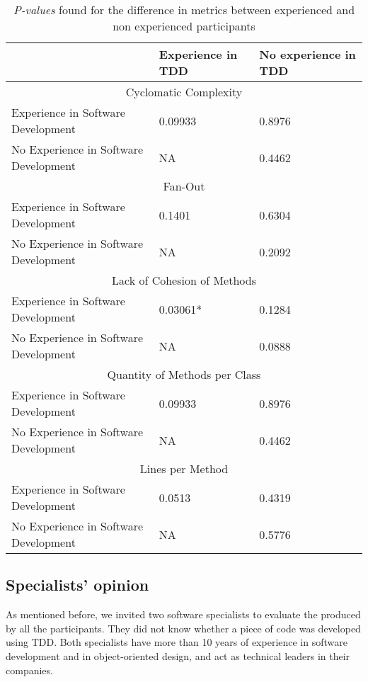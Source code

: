 \documentclass[times]{elsarticle}
\begin{document}
\begin{table}
	\centering
	\begin{tabular}{ | p{4cm} | p{3cm} | p{3cm} | }
		\hline
		  & \textbf{Experience in TDD} & \textbf{No experience in TDD} \\
		\hline
			\multicolumn{3}{|c|}{Cyclomatic Complexity} \\
		\hline
			Experience in Software Development 		& 0.09933	&	0.8976\\
			\hline
			No Experience in Software Development 	& NA		&	0.4462\\
		\hline
			\multicolumn{3}{|c|}{Fan-Out}\\
		\hline
			Experience in Software Development 		& 0.1401	&	0.6304\\
			\hline
			No Experience in Software Development 	& NA		&	0.2092\\
		\hline
			\multicolumn{3}{|c|}{Lack of Cohesion of Methods}\\
		\hline
			Experience in Software Development 		& \cellcolor[gray]{0.8}0.03061*	&	0.1284\\
			\hline
			No Experience in Software Development 	& NA		&	0.0888\\
		\hline
			\multicolumn{3}{|c|}{Quantity of Methods per Class} \\
		\hline
			Experience in Software Development 		& 0.09933	&	0.8976\\
			\hline
			No Experience in Software Development 	& NA		&	0.4462\\
		\hline
			\multicolumn{3}{|c|}{Lines per Method}\\
		\hline
			Experience in Software Development 		& 0.0513	&	0.4319\\
			\hline
			No Experience in Software Development 	& NA		&	0.5776\\
		\hline
	\end{tabular}
	\caption{\textit{P-values} found for the difference in metrics between experienced and non experienced participants}
	\label{valores-separados}
\end{table}

\subsection{Specialists' opinion}

As mentioned before, we invited two software specialists to evaluate the produced by
all the participants. They did not know whether a piece of code was developed using
TDD. Both specialists have more than 10 years of experience in software development
and in object-oriented design, and act as technical leaders in their companies.
\end{document}
